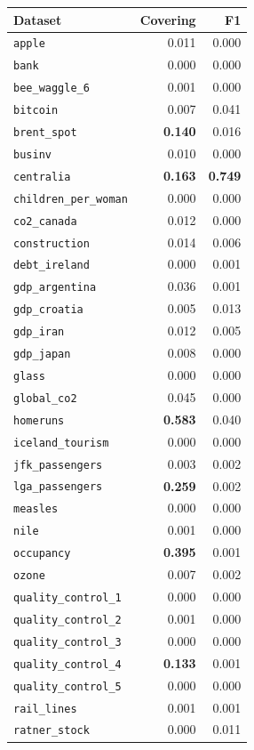 \begin{tabular}{lrr}
Dataset & Covering & F1\\
\toprule
\verb+apple+ & 0.011 & 0.000\\
\verb+bank+ & 0.000 & 0.000\\
\verb+bee_waggle_6+ & 0.001 & 0.000\\
\verb+bitcoin+ & 0.007 & 0.041\\
\verb+brent_spot+ & \textbf{0.140} & 0.016\\
\verb+businv+ & 0.010 & 0.000\\
\verb+centralia+ & \textbf{0.163} & \textbf{0.749}\\
\verb+children_per_woman+ & 0.000 & 0.000\\
\verb+co2_canada+ & 0.012 & 0.000\\
\verb+construction+ & 0.014 & 0.006\\
\verb+debt_ireland+ & 0.000 & 0.001\\
\verb+gdp_argentina+ & 0.036 & 0.001\\
\verb+gdp_croatia+ & 0.005 & 0.013\\
\verb+gdp_iran+ & 0.012 & 0.005\\
\verb+gdp_japan+ & 0.008 & 0.000\\
\verb+glass+ & 0.000 & 0.000\\
\verb+global_co2+ & 0.045 & 0.000\\
\verb+homeruns+ & \textbf{0.583} & 0.040\\
\verb+iceland_tourism+ & 0.000 & 0.000\\
\verb+jfk_passengers+ & 0.003 & 0.002\\
\verb+lga_passengers+ & \textbf{0.259} & 0.002\\
\verb+measles+ & 0.000 & 0.000\\
\verb+nile+ & 0.001 & 0.000\\
\verb+occupancy+ & \textbf{0.395} & 0.001\\
\verb+ozone+ & 0.007 & 0.002\\
\verb+quality_control_1+ & 0.000 & 0.000\\
\verb+quality_control_2+ & 0.001 & 0.000\\
\verb+quality_control_3+ & 0.000 & 0.000\\
\verb+quality_control_4+ & \textbf{0.133} & 0.001\\
\verb+quality_control_5+ & 0.000 & 0.000\\
\verb+rail_lines+ & 0.001 & 0.001\\
\verb+ratner_stock+ & 0.000 & 0.011\\

\end{tabular}
